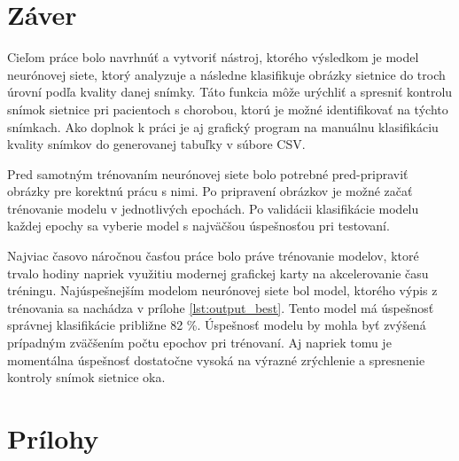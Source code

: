 \documentclass[a4paper, 11pt]{article}
\begin{document}
\section{Záver}
Cieľom práce bolo navrhnúť a vytvoriť nástroj, ktorého výsledkom je model neurónovej siete, ktorý analyzuje a následne klasifikuje obrázky sietnice do troch úrovní podľa kvality danej snímky. Táto funkcia môže urýchliť a spresniť kontrolu snímok sietnice pri pacientoch s chorobou, ktorú je možné identifikovať na týchto snímkach. Ako doplnok k práci je aj grafický program na manuálnu klasifikáciu kvality snímkov do generovanej tabuľky v súbore CSV.

Pred samotným trénovaním neurónovej siete bolo potrebné pred-pripraviť obrázky pre korektnú prácu s nimi. Po pripravení obrázkov je možné začať trénovanie modelu v jednotlivých epochách. Po validácii klasifikácie modelu každej epochy sa vyberie model s najväčšou úspešnosťou pri testovaní.

Najviac časovo náročnou časťou práce bolo práve trénovanie modelov, ktoré trvalo hodiny napriek využitiu modernej grafickej karty na akcelerovanie času tréningu.
Najúspešnejším modelom neurónovej siete bol model, ktorého výpis z trénovania sa nachádza v prílohe \ref{lst:output_best}. Tento model má úspešnosť správnej klasifikácie približne 82 \%. Úspešnosť modelu by mohla byť zvýšená prípadným zväčšením počtu epochov pri trénovaní. Aj napriek tomu je momentálna úspešnosť dostatočne vysoká na výrazné zrýchlenie a spresnenie kontroly snímok sietnice oka.
\pagebreak

\renewcommand{\refname}{Zdroje}




\newpage
\section{Prílohy}
\end{document}
